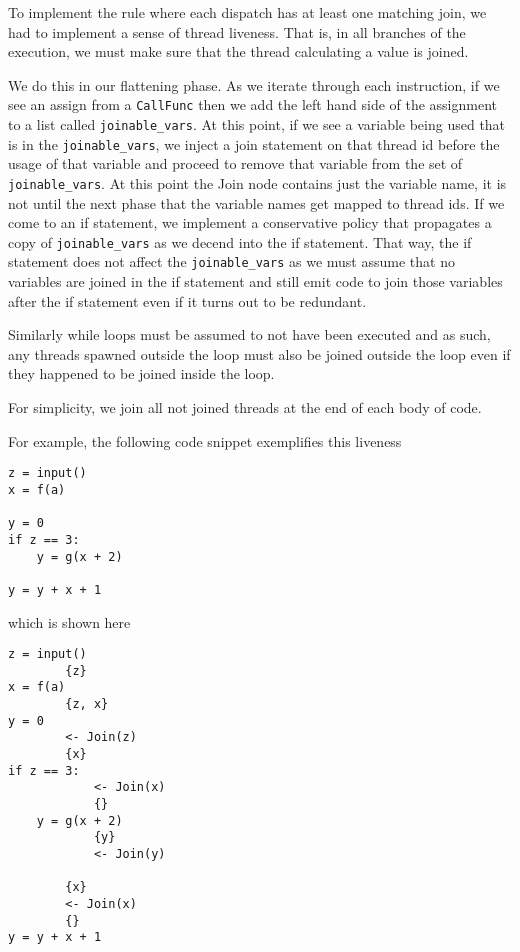 \documentclass{acm_proc_article-sp}
\begin{document}
To implement the rule where each dispatch has at least one matching join, we
had to implement a sense of thread liveness. That is, in all branches of the
execution, we must make sure that the thread calculating a value is joined.

We do this in our flattening phase. As we iterate through each instruction, if
we see an assign from a \verb|CallFunc| then we add the left hand side of the
assignment to a list called \verb|joinable_vars|. At this point, if we see a
variable being used that is in the \verb|joinable_vars|, we inject a join
statement on that thread id before the usage of that variable and proceed to
remove that variable from the set of \verb|joinable_vars|. At this point the
Join node contains just the variable name, it is not until the next phase that
the variable names get mapped to thread ids.  If we come to an if statement, we
implement a conservative policy that propagates a copy of \verb|joinable_vars|
as we decend into the if statement. That way, the if statement does not affect
the \verb|joinable_vars| as we must assume that
no variables are joined in the if statement and still emit code to join those
variables after the if statement even if it turns out to be redundant.

Similarly while loops must be assumed to not have been executed and as such,
any threads spawned outside the loop must also be joined outside the loop even
if they happened to be joined inside the loop.

For simplicity, we join all not joined threads at the end of each body of code.


For example, the following code snippet exemplifies this liveness

\begin{verbatim}
z = input()
x = f(a)

y = 0
if z == 3:
    y = g(x + 2)

y = y + x + 1
\end{verbatim}

which is shown here

\begin{verbatim}
z = input()
        {z}
x = f(a)
        {z, x}
y = 0
        <- Join(z)
        {x}
if z == 3:
            <- Join(x)
            {}
    y = g(x + 2)
            {y}
            <- Join(y)

        {x}
        <- Join(x)
        {}
y = y + x + 1
\end{verbatim}
\end{document}
